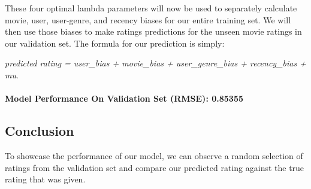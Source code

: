 \documentclass[
]{article}
\newenvironment{Shaded}{\begin{snugshade}}{\end{snugshade}}
\newcommand{\DataTypeTok}[1]{\textcolor[rgb]{0.13,0.29,0.53}{#1}}
\newcommand{\DecValTok}[1]{\textcolor[rgb]{0.00,0.00,0.81}{#1}}
\newcommand{\FloatTok}[1]{\textcolor[rgb]{0.00,0.00,0.81}{#1}}
\newcommand{\KeywordTok}[1]{\textcolor[rgb]{0.13,0.29,0.53}{\textbf{#1}}}
\newcommand{\NormalTok}[1]{#1}
\newcommand{\OperatorTok}[1]{\textcolor[rgb]{0.81,0.36,0.00}{\textbf{#1}}}
\newcommand{\StringTok}[1]{\textcolor[rgb]{0.31,0.60,0.02}{#1}}
\begin{document}
These four optimal lambda parameters will now be used to separately
calculate movie, user, user-genre, and recency biases for our entire
training set. We will then use those biases to make ratings predictions
for the unseen movie ratings in our validation set. The formula for our
prediction is simply:

\emph{predicted rating = user\_bias + movie\_bias + user\_genre\_bias +
recency\_bias + mu}.

\hypertarget{model-performance-on-validation-set-rmse-0.85355}{%
\paragraph{Model Performance On Validation Set (RMSE):
0.85355}\label{model-performance-on-validation-set-rmse-0.85355}}

\hypertarget{conclusion}{%
\subsection{Conclusion}\label{conclusion}}

To showcase the performance of our model, we can observe a random
selection of ratings from the validation set and compare our predicted
rating against the true rating that was given.

\begin{Shaded}
\end{Shaded}
\end{document}
